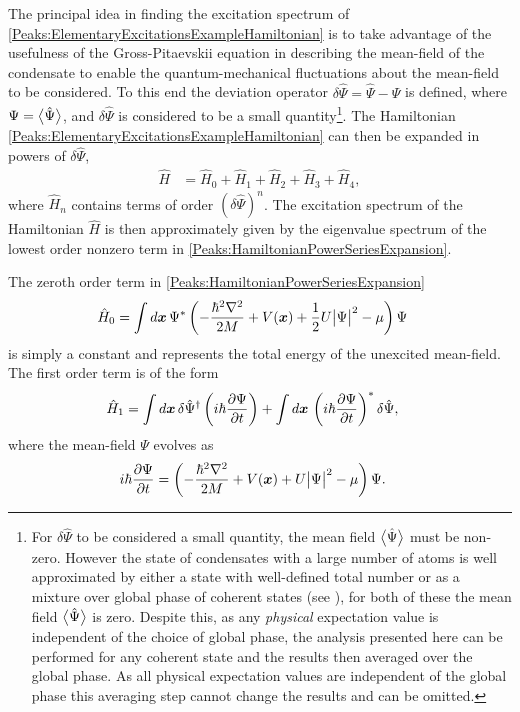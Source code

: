 The principal idea in finding the excitation spectrum of \eqref{Peaks:ElementaryExcitationsExampleHamiltonian} is to take advantage of the usefulness of the Gross-Pitaevskii equation in describing the mean-field of the condensate to enable the quantum-mechanical fluctuations about the mean-field to be considered. To this end the deviation operator $\delta \hat{\Psi} = \hat{\Psi} - \Psi$ is defined, where $\Psi = {\big<\hat{\Psi}\big>}$, and $\delta \hat{\Psi}$ is considered to be a small quantity\footnote{For $\delta\hat{\Psi}$ to be considered a small quantity, the mean field ${\big<\hat{\Psi}\big>}$ must be non-zero. However the state of condensates with a large number of atoms is well approximated by either a state with well-defined total number or as a mixture over global phase of coherent states (see ), for both of these the mean field ${\big<\hat{\Psi}\big>}$ is zero. Despite this, as any \emph{physical} expectation value is independent of the choice of global phase, the analysis presented here can be performed for any coherent state and the results then averaged over the global phase. As all physical expectation values are independent of the global phase this averaging step cannot change the results and can be omitted.}. The Hamiltonian \eqref{Peaks:ElementaryExcitationsExampleHamiltonian} can then be expanded in powers of $\delta \hat{\Psi}$,
\begin{align}
    \label{Peaks:HamiltonianPowerSeriesExpansion}
    \hat{H} &= \hat{H}_0 + \hat{H}_1 + \hat{H}_2 + \hat{H}_3 + \hat{H}_4,
\end{align}
where $\hat{H}_n$ contains terms of order $(\delta\hat{\Psi})^n$. The excitation spectrum of the Hamiltonian $\hat{H}$ is then approximately given by the eigenvalue spectrum of the lowest order nonzero term in \eqref{Peaks:HamiltonianPowerSeriesExpansion}.

The zeroth order term in \eqref{Peaks:HamiltonianPowerSeriesExpansion}
\begin{align}
    \hat{H}_0 &= \int d \bm{x}\, \Psi^* \left( -\frac{\hbar^2 \nabla^2}{2M} + V(\bm{x}) + \frac{1}{2} U \big|\Psi\big|^2 - \mu \right) \Psi
\end{align}
is simply a constant and represents the total energy of the unexcited mean-field. The first order term is of the form
\begin{align}
    \hat{H}_1 &= \int d \bm{x}\, \delta \hat{\Psi}^\dagger \left(i \hbar \frac{\partial \Psi}{\partial t} \right)  + \int d \bm{x}\, \left(i \hbar \frac{\partial \Psi}{\partial t} \right)^* \delta \hat{\Psi},
\end{align}
where the mean-field $\Psi$ evolves as
\begin{align}
    i \hbar \frac{\partial\Psi}{\partial t} &= \left(-\frac{\hbar^2 \nabla^2}{2 M} + V(\bm{x}) + U \big| \Psi\big|^2 - \mu \right) \Psi.
\end{align}

